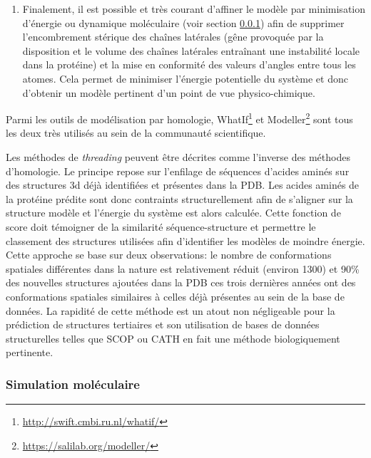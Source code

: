 \begin{enumerate}
	\item Finalement, il est possible et très courant d'affiner le modèle par minimisation d'énergie ou dynamique moléculaire (voir section \ref{simu}) afin de supprimer l'encombrement stérique des chaînes latérales (gêne provoquée par la disposition et le volume des chaînes latérales entraînant une instabilité locale dans la protéine) et la mise en conformité des valeurs d'angles entre tous les atomes. Cela permet de minimiser l'énergie potentielle du système et donc d'obtenir un modèle pertinent d'un point de vue physico-chimique.
\end{enumerate}

Parmi les outils de modélisation par homologie, WhatIf\footnote{\url{http://swift.cmbi.ru.nl/whatif/}} et Modeller\footnote{\url{https://salilab.org/modeller/}} sont tous les deux très utilisés au sein de la communauté scientifique.


Les méthodes de \textit{threading} peuvent être décrites comme l'inverse des méthodes d'homologie. Le principe repose sur l'enfilage de séquences d'acides aminés sur des structures 3d déjà identifiées et présentes dans la PDB. Les acides aminés de la protéine prédite sont donc contraints structurellement afin de s'aligner sur la structure modèle et l'énergie du système est alors calculée. Cette fonction de score doit témoigner de la similarité séquence-structure et permettre le classement des structures utilisées afin d'identifier les modèles de moindre énergie.
Cette approche se base sur deux observations: le nombre de conformations spatiales différentes dans la nature est relativement réduit (environ 1300) et 90\% des nouvelles structures ajoutées dans la PDB ces trois dernières années ont des conformations spatiales similaires à celles déjà présentes au sein de la base de données.
La rapidité de cette méthode est un atout non négligeable pour la prédiction de structures tertiaires et son utilisation de bases de données structurelles telles que SCOP ou CATH en fait une méthode biologiquement pertinente.

\subsubsection{Simulation moléculaire} \label{simu}


